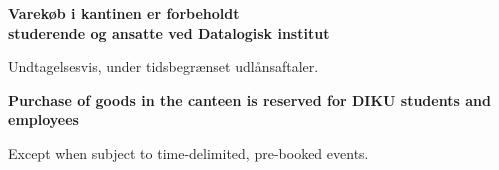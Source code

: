 \documentclass{article}
\begin{document}
\maketitle

\null

\vspace{-0.5cm}

\begin{center}

\vspace{0.5cm}%
\begin{center}%

\fontsize{30}{30}\selectfont\bf Varekøb i kantinen er forbeholdt \\ studerende
og ansatte ved Datalogisk institut

\end{center}%
\vspace{0.7cm}%

\vspace{-0.7cm}

\Huge

Undtagelsesvis, under tidsbegrænset udlånsaftaler.

\english

\vspace{0.7cm}%
\begin{center}%

\fontsize{30}{30}\selectfont\bf Purchase of goods in the canteen is reserved
for DIKU students and employees

\end{center}%
\vspace{0.7cm}%

\vspace{-1.1cm}

Except when subject to time-delimited, pre-booked events.

\end{center}

\dansk

\underskriv
\end{document}
